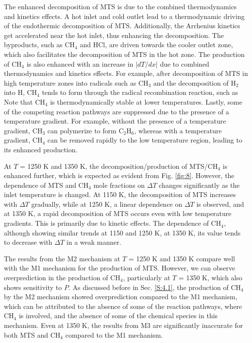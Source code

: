 \documentclass[final, letterpaper, square, comma, numbers, sort&compress]{elsarticle}
\begin{document}
The enhanced decomposition of MTS is due to the combined thermodynamics and kinetics effects. A hot inlet and cold outlet lead to a thermodynamic driving of the endothermic decomposition of MTS. Additionally, the Arrhenius kinetics get accelerated near the hot inlet, thus enhancing the decomposition. The byproducts, such as CH$_4$ and HCl, are driven towards the cooler outlet zone, which also facilitates the decomposition of MTS in the hot zone. The production of CH$_4$ is also enhanced with an increase in $|dT/dx|$ due to combined thermodynamics and kinetics effects. For example, after decomposition of MTS in high temperature zones into radicals such as CH$_3$ and the decomposition of H$_2$ into H, CH$_4$ tends to form through the radical recombination reaction, such as
Note that CH$_4$ is thermodynamically stable at lower temperatures. Lastly, some of the competing reaction pathways are suppressed due to the presence of a temperature gradient. For example, without the presence of a temperature gradient, CH$_3$ can polymerize to form C$_2$H$_6$, whereas with a temperature gradient, CH$_4$ can be removed rapidly to the low temperature region, leading to its enhanced production.

At $T$ = 1250 K and 1350 K, the decomposition/production of MTS/CH$_4$ is enhanced further, which is expected as evident from Fig. \ref{fig:8}. However, the dependence of MTS and CH$_4$ mole fractions on $\Delta T$ changes significantly as the inlet temperature is changed. At 1150 K, the decomposition of MTS increases with $\Delta T$ gradually, while at 1250 K, a linear dependence on $\Delta T$ is observed, and at 1350 K, a rapid decomposition of MTS occurs even with low temperature gradients. This is primarily due to kinetic effects. The dependence of CH$_4$, although showing similar trends at 1150 and 1250 K, at 1350 K, its value tends to decrease with $\Delta T$ in a weak manner.

The results from the M2 mechanism at $T$ = 1250 K and 1350 K compare well with the M1 mechanism for the production of MTS. However, we can observe overprediction in the production of CH$_4$, particularly at $T$ = 1350 K, which also shows sensitivity to $P$. As discussed before in Sec. \ref{S:4.1}, the production of CH$_4$ by the M2 mechanism showed overprediction compared to the M1 mechanism, which can be attributed to the absence of some of the reaction pathways, where CH$_4$ is involved, and the absence of some of the chemical species in this mechanism. Even at 1350 K, the results from M3 are significantly inaccurate for both MTS and CH$_4$ compared to the M1 mechanism.
\end{document}
